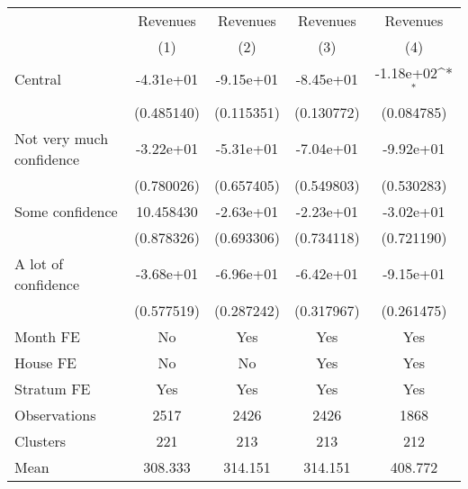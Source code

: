 {
\def\sym#1{\ifmmode^{#1}\else\(^{#1}\)\fi}
\begin{tabular}{l*{4}{c}}
\toprule
                &\multicolumn{1}{c}{Revenues}&\multicolumn{1}{c}{Revenues}&\multicolumn{1}{c}{Revenues}&\multicolumn{1}{c}{Revenues}\\
                &\multicolumn{1}{c}{(1)}         &\multicolumn{1}{c}{(2)}         &\multicolumn{1}{c}{(3)}         &\multicolumn{1}{c}{(4)}         \\
\midrule
Central         &-4.31e+01         &-9.15e+01         &-8.45e+01         &-1.18e+02\sym{*}  \\
                &(0.485140)         &(0.115351)         &(0.130772)         &(0.084785)         \\
Not very much confidence&-3.22e+01         &-5.31e+01         &-7.04e+01         &-9.92e+01         \\
                &(0.780026)         &(0.657405)         &(0.549803)         &(0.530283)         \\
Some confidence &10.458430         &-2.63e+01         &-2.23e+01         &-3.02e+01         \\
                &(0.878326)         &(0.693306)         &(0.734118)         &(0.721190)         \\
A lot of confidence&-3.68e+01         &-6.96e+01         &-6.42e+01         &-9.15e+01         \\
                &(0.577519)         &(0.287242)         &(0.317967)         &(0.261475)         \\
Month FE        &       No         &      Yes         &      Yes         &      Yes         \\
House FE        &       No         &       No         &      Yes         &      Yes         \\
Stratum FE      &      Yes         &      Yes         &      Yes         &      Yes         \\
\midrule
Observations    &     2517         &     2426         &     2426         &     1868         \\
Clusters        &      221         &      213         &      213         &      212         \\
Mean            &  308.333         &  314.151         &  314.151         &  408.772         \\
\bottomrule
\end{tabular}
}
